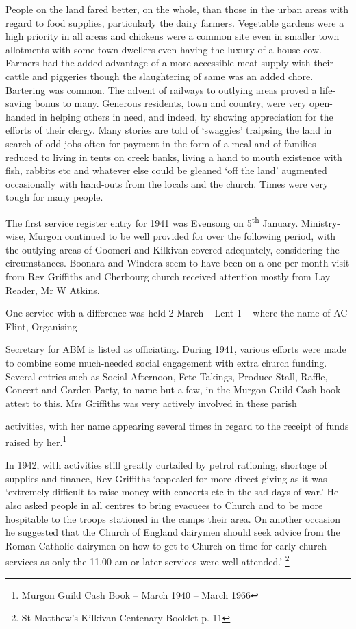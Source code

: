 People on the land fared better, on the whole, than those in the urban areas with regard to food supplies, particularly the dairy farmers. Vegetable gardens were a high priority in all areas and chickens were a common site even in smaller town allotments with some town dwellers even having the luxury of a house cow. Farmers had the added advantage of a more accessible meat supply with their cattle and piggeries though the slaughtering of same was an added chore. Bartering was common. The advent of railways to outlying areas proved a life-saving bonus to many. Generous residents, town and country, were very open-handed in helping others in need, and indeed, by showing appreciation for the efforts of their clergy. Many stories are told of `swaggies' traipsing the land in search of odd jobs often for payment in the form of a meal and of families reduced to living in tents on creek banks, living a hand to mouth existence with fish, rabbits etc and whatever else could be gleaned `off the land' augmented occasionally with hand-outs from the locals and the church. Times were very tough for many people.

The first service register entry for 1941 was Evensong on 5\textsuperscript{th} January. Ministry-wise, Murgon continued to be well provided for over the following period, with the outlying areas of Goomeri and Kilkivan covered adequately, considering the circumstances. Boonara and Windera seem to have been on a one-per-month visit from Rev Griffiths and Cherbourg church received attention mostly from Lay Reader, Mr W Atkins.

One service with a difference was held 2 March -- Lent 1 -- where the name of AC Flint, Organising

Secretary for ABM is listed as officiating. During 1941, various efforts were made to combine some much-needed social engagement with extra church funding. Several entries such as Social Afternoon, Fete Takings, Produce Stall, Raffle, Concert and Garden Party, to name but a few, in the Murgon Guild Cash book attest to this. Mrs Griffiths was very actively involved in these parish

activities, with her name appearing several times in regard to the receipt of funds raised by her.\footnote{Murgon Guild Cash Book -- March 1940 -- March 1966}

In 1942, with activities still greatly curtailed by petrol rationing, shortage of supplies and finance, Rev Griffiths `appealed for more direct giving as it was `extremely difficult to raise money with concerts etc in the sad days of war.' He also asked people in all centres to bring evacuees to Church and to be more hospitable to the troops stationed in the camps their area. On another occasion he suggested that the Church of England dairymen should seek advice from the Roman Catholic dairymen on how to get to Church on time for early church services as only the 11.00 am or later services were well attended.' \footnote{St Matthew's Kilkivan Centenary Booklet p. 11}

